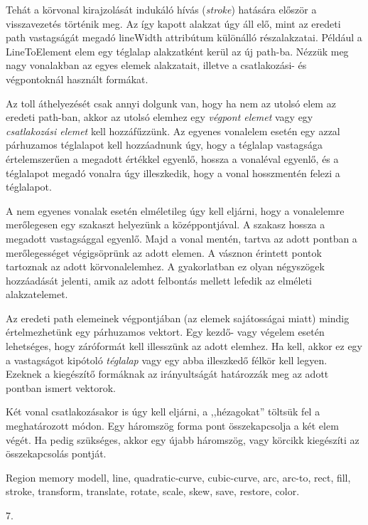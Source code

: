 \documentclass[12pt]{report}
\theoremstyle{definition}
\newcommand{\func}[1]{{\textsf{\footnotesize{#1}}}}
\begin{document}
Tehát a körvonal kirajzolását indukáló hívás (\emph{stroke}) hatására először a
visszavezetés történik meg. Az így kapott alakzat úgy áll elő, mint az eredeti
path vastagságát megadó \func{lineWidth} attribútum különálló részalakzatai.
Például a \func{LineToElement} elem egy téglalap alakzatként kerül az új
path-ba. Nézzük meg nagy vonalakban az egyes elemek alakzatait, illetve a
csatlakozási- és végpontoknál használt formákat.

Az toll áthelyezését csak annyi dolgunk van, hogy ha nem az utolsó elem az
eredeti path-ban, akkor az utolsó elemhez egy \emph{végpont elemet} vagy egy
\emph{csatlakozási elemet} kell hozzáfűzzünk. Az egyenes vonalelem esetén egy
azzal párhuzamos téglalapot kell hozzáadnunk úgy, hogy a téglalap vastagsága
értelemszerűen a megadott értékkel egyenlő, hossza a vonaléval egyenlő, és a
téglalapot megadó vonalra úgy illeszkedik, hogy a vonal hosszmentén felezi
a téglalapot.

A nem egyenes vonalak esetén elméletileg úgy kell eljárni, hogy a vonalelemre
merőlegesen egy szakaszt helyezünk a középpontjával. A szakasz hossza a
megadott vastagsággal egyenlő. Majd a vonal mentén, tartva az adott pontban a
merőlegességet végigsöprünk az adott elemen. A vásznon érintett pontok
tartoznak az adott körvonalelemhez. A gyakorlatban ez olyan négyszögek
hozzáadását jelenti, amik az adott felbontás mellett lefedik az elméleti
alakzatelemet.

Az eredeti path elemeinek végpontjában (az elemek sajátosságai miatt) mindig
értelmezhetünk egy párhuzamos vektort. Egy kezdő- vagy végelem esetén
lehetséges, hogy záróformát kell illesszünk az adott elemhez. Ha kell, akkor ez egy a
vastagságot kipótoló \emph{téglalap} vagy egy abba illeszkedő félkör
kell legyen. Ezeknek a kiegészítő formáknak az irányultságát
határozzák meg az adott pontban ismert vektorok.

Két vonal csatlakozásakor is úgy kell eljárni, a ,,hézagokat'' töltsük
fel a meghatározott módon. Egy háromszög forma pont összekapcsolja a két
elem végét. Ha pedig szükséges, akkor egy újabb háromszög, vagy körcikk
kiegészíti az összekapcsolás pontját.

  \begin{description}[noitemsep]
    \item[Kulcsszavak] Region memory modell, line, quadratic-curve,
    cubic-curve, arc, arc-to, rect, fill, stroke, transform, translate, rotate,
    scale, skew, save, restore, color.
    \item[Becsült oldalszám] 7.
  \end{description}
\end{document}
